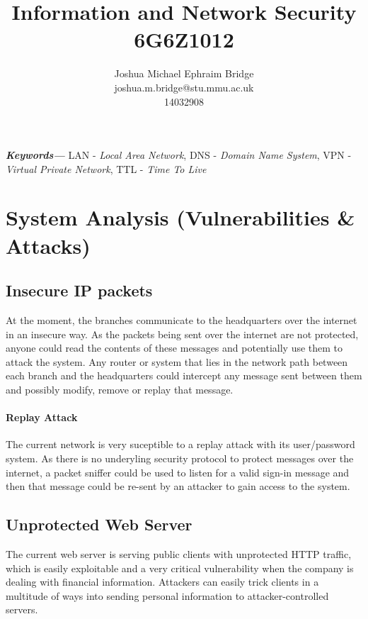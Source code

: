 \documentclass[11pt]{article}
\title{\vspace{2cm}\textbf{Information and Network Security}\\6G6Z1012}
\author{Joshua Michael Ephraim Bridge\\joshua.m.bridge@stu.mmu.ac.uk\\14032908}
\providecommand{\keywords}[1] {
  \small
  \textbf{\textit{Keywords---}} #1
}
\begin{document}
  \maketitle

  \vspace{1cm}

  \begin{abstract}

  \end{abstract}

  \vspace{0.5cm}

  \keywords{LAN - \textit{Local Area Network}, DNS - \textit{Domain Name System}, VPN - \textit{Virtual Private Network}, TTL - \textit{Time To Live}}

  \newpage


  \section{System Analysis (Vulnerabilities \& Attacks)}
    \subsection{Insecure IP packets}
      At the moment, the branches communicate to the headquarters over the internet in an insecure way. As the packets being sent over the internet are not protected, anyone could read the contents of these messages and potentially use them to attack the system. Any router or system that lies in the network path between each branch and the headquarters could intercept any message sent between them and possibly modify, remove or replay that message.

      \paragraph{Replay Attack}
        The current network is very suceptible to a replay attack with its user/password system. As there is no underyling security protocol to protect messages over the internet, a packet sniffer could be used to listen for a valid sign-in message and then that message could be re-sent by an attacker to gain access to the system.

    \subsection{Unprotected Web Server} %
      The current web server is serving public clients with unprotected HTTP traffic, which is easily exploitable and a very critical vulnerability when the company is dealing with financial information. Attackers can easily trick clients in a multitude of ways into sending personal information to attacker-controlled servers.
\end{document}
